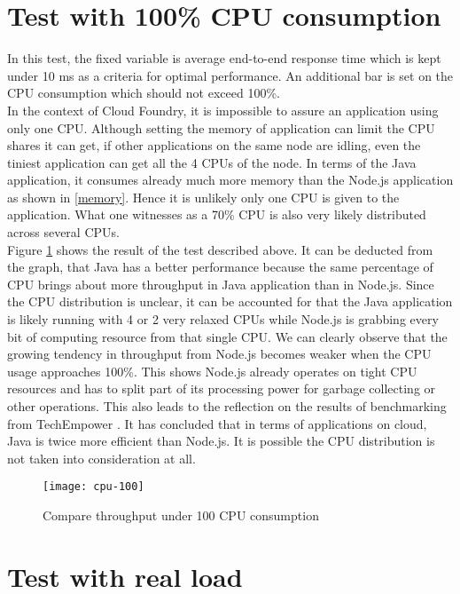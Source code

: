 \section{Test with 100\% CPU consumption}
In this test, the fixed variable is average end-to-end response time which is kept under 10 ms  as a criteria for optimal performance. An additional bar is set on the CPU consumption which should not exceed 100\%. \\
In the context of Cloud Foundry, it is impossible to assure an application using only one CPU. Although setting the memory of application can limit the CPU shares it can get, if other applications on the same node are idling, even the tiniest application can get all the 4 CPUs of the node. In terms of the Java application, it consumes already much more memory than the Node.js application as shown in \ref{memory}. Hence it is unlikely only one CPU is given to the application. What one witnesses as a 70\% CPU is also very likely distributed across several CPUs.\\
Figure \ref{cpu-100} shows the result of the test described above. It can be deducted from the graph, that Java has a better performance because the same percentage of CPU brings about more throughput in Java application than in Node.js. Since the CPU distribution is unclear, it can be accounted for that the Java application is likely running with 4 or 2 very relaxed CPUs while Node.js is grabbing every bit of computing resource from that single CPU. We can clearly observe that the growing tendency in throughput from Node.js becomes weaker when the CPU usage approaches 100\%. This shows Node.js already operates on tight CPU resources and has to split part of its processing power for garbage collecting or other operations. This also leads to the reflection on the results of benchmarking from TechEmpower \citep{Benchmark}. It has concluded that in terms of applications on cloud, Java is twice more efficient than Node.js. It is possible the CPU distribution is not taken into consideration at all. 

\begin{figure}[h]
	\centering
	\texttt{[image: cpu-100]}
	\caption{Compare throughput under 100 CPU consumption}
	\label{cpu-100}
\end{figure}


\section{Test with real load}
